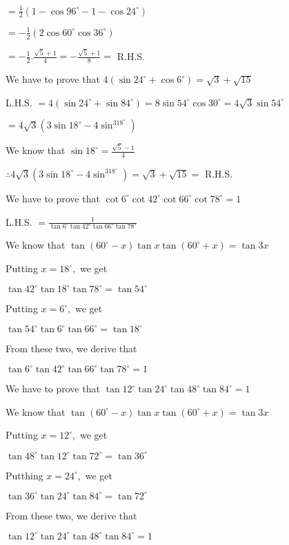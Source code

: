   $= \frac{1}{2}\left(1 - \cos96^\circ - 1 - \cos24^\circ\right)$

  $= -\frac{1}{2}\left(2\cos60^\circ\cos36^\circ\right)$

  $= -\frac{1}{2}.\frac{\sqrt{5} + 1}{4} = -\frac{\sqrt{5} + 1}{8} =$ R.H.S.

\item We have to prove that $4(\sin 24^\circ + \cos6^\circ) = \sqrt{3} + \sqrt{15}$

  L.H.S. $= 4(\sin24^\circ + \sin84^\circ) = 8\sin54^\circ\cos30^\circ = 4\sqrt{3}\sin54^\circ$

  $= 4\sqrt{3}(3\sin18^\circ - 4\sin^318^\circ)$

  We know that $\sin 18^\circ = \frac{\sqrt{5} - 1}{4}$

  $\therefore 4\sqrt{3}(3\sin18^\circ - 4\sin^318^\circ) = \sqrt{3} + \sqrt{15} =$ R.H.S.

\item We have to prove that $\cot6^\circ\cot42^\circ\cot66^\circ\cot78^\circ = 1$

  L.H.S. $= \frac{1}{\tan6^\circ\tan42^\circ\tan66^\circ\tan78^\circ}$

  We know that $\tan(60^\circ - x)\tan x\tan(60^\circ + x) = \tan 3x$

  Putting $x=18^\circ,$ we get

  $\tan42^\circ\tan18^\circ\tan78^\circ = \tan54^\circ$

  Putting $x=6^\circ,$ we get

  $\tan54^\circ\tan6^\circ\tan66^\circ = \tan18^\circ$

  From these two, we derive that

  $\tan6^\circ\tan42^\circ\tan66^\circ\tan78^\circ = 1$

\item We have to prove that $\tan12^\circ\tan24^\circ\tan48^\circ\tan84^\circ = 1$

  We know that $\tan(60^\circ - x)\tan x\tan(60^\circ + x) = \tan 3x$

  Putting $x= 12^\circ,$ we get

  $\tan48^\circ\tan 12^\circ\tan72^\circ = \tan 36^\circ$

  Putthing $x = 24^\circ,$ we get

  $\tan36^\circ\tan24^\circ\tan84^\circ = \tan72^\circ$

  From these two, we derive that

  $\tan12^\circ\tan24^\circ\tan48^\circ\tan84^\circ = 1$

